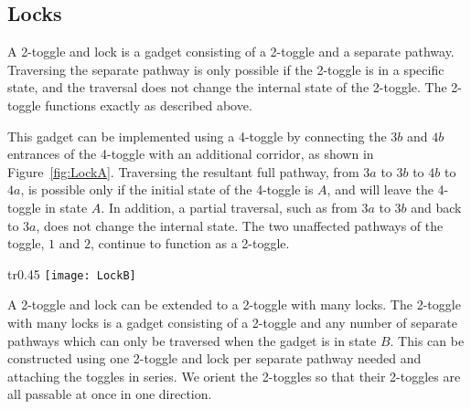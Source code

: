 \subsection{Locks}

A 2-toggle and lock is a gadget consisting of a 2-toggle and a separate pathway. Traversing the separate pathway is only possible if the 2-toggle is in a specific state, and the traversal does not change the internal state of the 2-toggle. The 2-toggle functions exactly
as described above.


This gadget can be implemented using a 4-toggle by
connecting the $3b$ and $4b$ entrances of the 4-toggle with an additional corridor, as shown in Figure~\ref{fig:LockA}.
Traversing the resultant full pathway, from $3a$ to $3b$ to $4b$ to $4a$, is possible only if the initial
state of the 4-toggle is $A$, and will leave the 4-toggle in state $A$. In addition, a partial traversal,
such as from $3a$ to $3b$ and back to $3a$, does not change the internal state. The two unaffected
pathways of the toggle, $1$ and $2$, continue to function as a 2-toggle.

\begin{wrapfigure}{tr}{0.45\textwidth}
\vspace{-5mm}
  \centering
    \texttt{[image: LockB]}
    \caption{Diagram of a lock. The $3a$ to $4a$ traversal is only possible in state $A$ and returns the toggle to state $A$.}
    \label{fig:LockA}
\vspace{-7mm}
\end{wrapfigure}

A 2-toggle and lock can be extended to a 2-toggle with many locks. The 2-toggle with many locks is a gadget consisting of a 2-toggle
and any number of separate pathways which can only be traversed when the gadget is in state $B$. This can be constructed using one 2-toggle and lock per separate pathway needed and attaching the toggles in series.
We orient the 2-toggles so that 
their 2-toggles are all passable at once in one direction.




